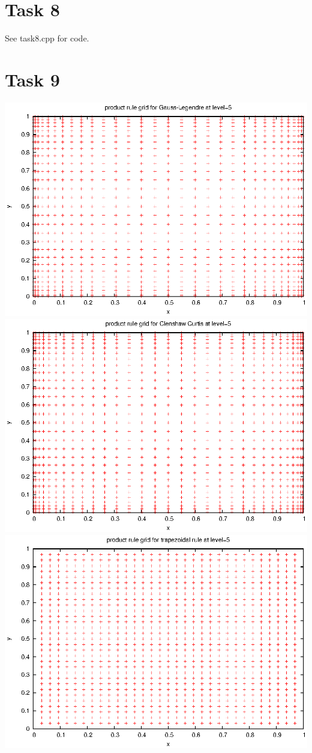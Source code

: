\documentclass[]{article}
\begin{document}
\section*{Task 8}
See task8.cpp for code.

\section*{Task 9}
\includegraphics[width=.9\textwidth]{task9_gauss}\\
\includegraphics[width=.9\textwidth]{task9_cc}\\
\includegraphics[width=.9\textwidth]{task9_trapezoidal}\\
\end{document}
